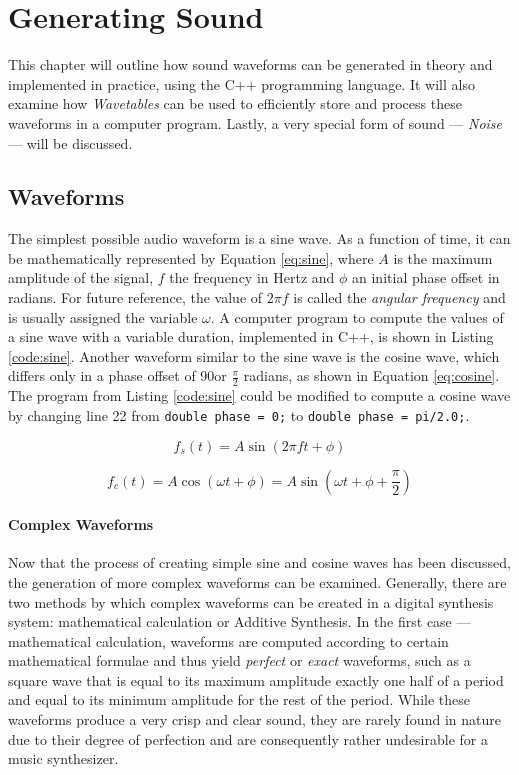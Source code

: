 \chapter{Generating Sound}

This chapter will outline how sound waveforms can be generated in theory and implemented in practice, using the C++ programming language. It will also examine how \emph{Wavetables} can be used to efficiently store and process these waveforms in a computer program. Lastly, a very special form of sound --- \emph{Noise} --- will be discussed.

\section{Waveforms}

The simplest possible audio waveform is a sine wave. As a function of time, it can be mathematically represented by Equation \ref{eq:sine}, where $A$ is the maximum amplitude of the signal, $f$ the frequency in Hertz and $\phi$ an initial phase offset in radians. For future reference, the value of $2 \pi f$ is called the \emph{angular frequency} and is usually assigned the variable $\omega$. A computer program to compute the values of a sine wave with a variable duration, implemented in C++, is shown in Listing \ref{code:sine}. Another waveform similar to the sine wave is the cosine wave, which differs only in a phase offset of 90\degree or $\frac{\pi}{2}$ radians, as shown in Equation \ref{eq:cosine}. The program from Listing \ref{code:sine} could be modified to compute a cosine wave by changing line 22 from \lstinline{double phase = 0;} to \lstinline{double phase = pi/2.0;}.

\begin{equation}
f_{s}(t) = A \sin(2 \pi  f t + \phi)
\label{eq:sine}
\end{equation}

\begin{equation}
f_{c}(t) = A \cos(\omega t + \phi) = A \sin(\omega t + \phi + \frac{\pi}{2})
\label{eq:cosine}
\end{equation}

\subsubsection{Complex Waveforms}

Now that the process of creating simple sine and cosine waves has been discussed, the generation of more complex waveforms can be examined. Generally, there are two methods by which complex waveforms can be created in a digital synthesis system: mathematical calculation or Additive Synthesis. In the first case --- mathematical calculation, waveforms are computed according to certain mathematical formulae and thus yield \emph{perfect} or \emph{exact} waveforms, such as a square wave that is equal to its maximum amplitude exactly one half of a period and equal to its minimum amplitude for the rest of the period. While these waveforms produce a very crisp and clear sound, they are rarely found in nature due to their degree of perfection and are consequently rather undesirable for a music synthesizer. \parbreak

